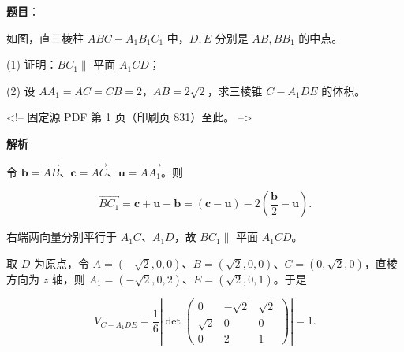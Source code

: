 \begin{answer}

\textbf{题目}：

如图，直三棱柱 $ABC-A_1B_1C_1$ 中，$D,E$ 分别是 $AB,BB_1$ 的中点。
\nopagebreak[4]
\begin{center}\end{center}
\nopagebreak[4]
(1) 证明：$BC_1\parallel$ 平面 $A_1CD$；

(2) 设 $AA_1=AC=CB=2$，$AB=2\sqrt2$，求三棱锥 $C-A_1DE$ 的体积。

<!-- 固定源 PDF 第 1 页（印刷页 831）至此。 -->

\textbf{解析}


令 $\boldsymbol b=\overrightarrow{AB}$、$\boldsymbol c=\overrightarrow{AC}$、$\boldsymbol u=\overrightarrow{AA_1}$。则

\nopagebreak[4]
\[\overrightarrow{BC_1}=\boldsymbol c+\boldsymbol u-\boldsymbol b=(\boldsymbol c-\boldsymbol u)-2\left(\frac{\boldsymbol b}{2}-\boldsymbol u\right).\]

右端两向量分别平行于 $A_1C$、$A_1D$，故 $BC_1\parallel$ 平面 $A_1CD$。


取 $D$ 为原点，令 $A=(-\sqrt2,0,0)$、$B=(\sqrt2,0,0)$、$C=(0,\sqrt2,0)$，直棱方向为 $z$ 轴，则 $A_1=(-\sqrt2,0,2)$、$E=(\sqrt2,0,1)$。于是

\nopagebreak[4]
\[V_{C-A_1DE}=\frac16\left|\det\begin{pmatrix}0&-\sqrt2&\sqrt2\\ \sqrt2&0&0\\0&2&1\end{pmatrix}\right|=1.\]



\end{answer}
